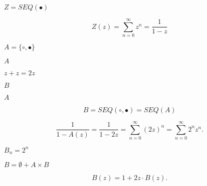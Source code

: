 \documentclass[10pt]{book}
\begin{document}
\begin{mdSnippets}
\begin{mdInlineSnippet}[1f11b7ae03fe41651d94de141afcc84a]
$Z=SEQ(\bullet)$\end{mdInlineSnippet}%
\begin{mdDisplaySnippet}%
\[%
Z(z) = \sum_{n=0}^\infty  z^n = \frac{1}{1 - z}
\]%
\end{mdDisplaySnippet}%
\begin{mdInlineSnippet}[fca55d2328dc748f13ca41b98911074e]%
$A = \{\circ,\bullet\}$\end{mdInlineSnippet}%
\begin{mdInlineSnippet}[7fc56270e7a70fa81a5935b72eacbe29]%
$A$\end{mdInlineSnippet}%
\begin{mdInlineSnippet}%
$z + z=2z$\end{mdInlineSnippet}%
\begin{mdInlineSnippet}%
$B$\end{mdInlineSnippet}%
\begin{mdInlineSnippet}[7fc56270e7a70fa81a5935b72eacbe29]%
$A$\end{mdInlineSnippet}%
\begin{mdDisplaySnippet}[78d6c064ae66b0f4dfe88cc53eb7691d]%
\[%
B = SEQ(\circ,\bullet)=SEQ(A)
\]%
\end{mdDisplaySnippet}%
\begin{mdDisplaySnippet}%
\[%
\frac{1}{1-A(z)}=\frac{1}{1-2z} = \sum_{n=0}^\infty (2z)^n=\sum_{n=0}^\infty 2^nz^n.
\]%
\end{mdDisplaySnippet}%
\begin{mdInlineSnippet}[40e5fb314fd79f999e5c45f397317655]%
$B_n=2^n$\end{mdInlineSnippet}%
\begin{mdInlineSnippet}[2e316beb75845dc29e752d522d1c77c8]%
$B = \emptyset + A \times B$\end{mdInlineSnippet}%
\begin{mdDisplaySnippet}[3359a0ee5a38412f5b8a9a46108a25b2]%
\[%
B(z) = 1 + 2z\cdot B(z).
\]%
\end{mdDisplaySnippet}%
\begin{mdInlineSnippet}[73723f147a6eb605351fc7f278dcecef]%

\end{mdInlineSnippet}
\end{mdSnippets}
\end{document}
